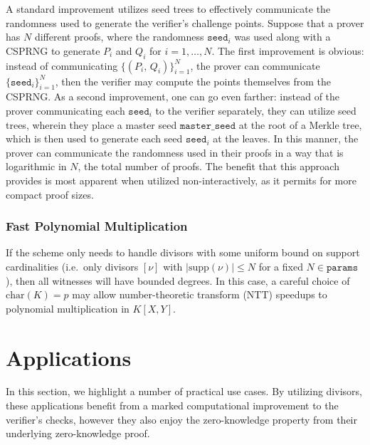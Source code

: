 \documentclass[11pt,letterpaper]{article}
\theoremstyle{definition}
\newcommand{\6}{\mathbf}
\newcommand{\7}{\mathcal}
\begin{document}
A standard improvement utilizes seed trees to effectively communicate the randomness used to generate the verifier's challenge points.
Suppose that a prover has $N$ different proofs, where the randomness $\texttt{seed}_i$ was used along with a CSPRNG to generate $P_i$ and $Q_i$ for $i=1, \dots, N$.
The first improvement is obvious: instead of communicating $\{(P_i, \, Q_i)\}_{i=1}^N$, the prover can communicate $\{\texttt{seed}_i\}_{i=1}^N$, then the verifier may compute the points themselves from the CSPRNG.
As a second improvement, one can go even farther: instead of the prover communicating each $\texttt{seed}_i$ to the verifier separately, they can utilize seed trees, wherein they place a master seed $\texttt{master\_seed}$ at the root of a Merkle tree, which is then used to generate each seed $\texttt{seed}_i$ at the leaves.
In this manner, the prover can communicate the randomness used in their proofs in a way that is logarithmic in $N$, the total number of proofs.
The benefit that this approach provides is most apparent when utilized non-interactively, as it permits for more compact proof sizes.

\subsubsection{Fast Polynomial Multiplication}

If the scheme only needs to handle divisors with some uniform bound on support cardinalities (i.e.\ only divisors $[\nu]$ with $\left|\text{supp}(\nu)\right| \leq N$ for a fixed $N \in \texttt{params}$), then all witnesses will have bounded degrees. In this case, a careful choice of $\text{char}(K) = p$ may allow number-theoretic transform (NTT) speedups to polynomial multiplication in $K[X,Y]$.









\section{Applications}

In this section, we highlight a number of practical use cases. By utilizing divisors, these applications benefit from a marked computational improvement to the verifier's checks, however they also enjoy the zero-knowledge property from their underlying zero-knowledge proof.
\end{document}
